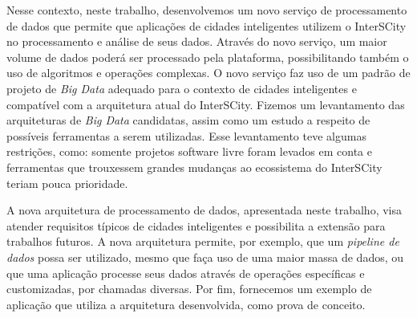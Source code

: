Nesse contexto, neste trabalho, desenvolvemos um novo serviço de processamento de dados que
permite que aplicações de cidades inteligentes utilizem o InterSCity no processamento e
análise de seus dados. Através do novo serviço,
um maior volume de dados poderá ser processado pela plataforma, possibilitando
também o uso de algoritmos e operações complexas. O novo serviço
faz uso de um padrão de projeto de \textit{Big Data} adequado para o contexto
de cidades inteligentes e compatível com a arquitetura atual do InterSCity.
Fizemos um levantamento das arquiteturas de \textit{Big Data} candidatas, assim
como um estudo a respeito de possíveis ferramentas a serem utilizadas. Esse
levantamento teve algumas restrições, como: somente projetos software livre
foram levados em conta e ferramentas que trouxessem grandes mudanças ao
ecossistema do InterSCity teriam pouca prioridade.

A nova arquitetura de processamento de dados, apresentada neste trabalho, visa
atender requisitos típicos de cidades inteligentes e possibilita a extensão
para trabalhos futuros. A nova arquitetura permite, por exemplo, que um
\textit{pipeline de dados} possa ser utilizado, mesmo que faça uso de uma
maior massa de dados, ou que uma aplicação processe seus dados através de
operações específicas e customizadas, por chamadas diversas. 
Por fim, fornecemos um exemplo de aplicação que utiliza a arquitetura
desenvolvida, como prova de conceito.
